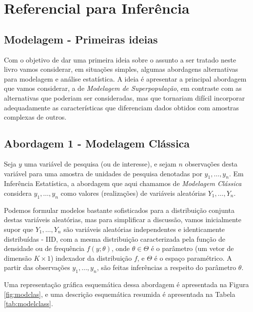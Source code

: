 \documentclass[
  12pt,
  brazilian,
]{book}
\theoremstyle{definition}
\theoremstyle{definition}
\theoremstyle{definition}
\theoremstyle{definition}
\theoremstyle{remark}
\begin{document}
\hypertarget{refinf}{%
\chapter{Referencial para Inferência}\label{refinf}}

\hypertarget{modelagem---primeiras-ideias}{%
\section{Modelagem - Primeiras ideias}\label{modelagem---primeiras-ideias}}

Com o objetivo de dar uma primeira ideia sobre o assunto a ser tratado neste
livro vamos considerar, em situações simples, algumas abordagens alternativas
para modelagem e análise estatística. A ideia é apresentar a principal abordagem
que vamos considerar, a de \emph{Modelagem de Superpopulação}, em contraste com as
alternativas que poderiam ser consideradas, mas que tornariam difícil incorporar
adequadamente as características que diferenciam dados obtidos com amostras complexas de outros.

\hypertarget{classic}{%
\section{Abordagem 1 - Modelagem Clássica}\label{classic}}

Seja \(y\) uma variável de pesquisa (ou de interesse), e sejam \(n\) observações desta
variável para uma amostra de unidades de pesquisa denotadas por \(y_1, \ldots ,y_n\).
Em Inferência Estatística, a abordagem que aqui chamamos de \emph{Modelagem Clássica}\\
considera \(y_1, \ldots ,y_n\) como valores (realizações) de variáveis aleatórias \(Y_1, \ldots ,Y_n\).

Podemos formular modelos bastante sofisticados para a distribuição conjunta
destas variáveis aleatórias, mas para simplificar a discussão, vamos inicialmente
supor que \(Y_1, \ldots ,Y_n\) são variáveis aleatórias independentes e
identicamente distribuídas - IID, com a mesma distribuição caracterizada pela função
de densidade ou de frequência \(f(y;\theta)\), onde \(\theta \in \Theta\) é o parâmetro
(um vetor de dimensão \(K \times 1\)) indexador da distribuição \(f\), e \(\Theta\) é
o espaço paramétrico. A partir das observações \(y_1, \ldots ,y_n\), são feitas inferências a respeito do parâmetro \(\theta\).

Uma representação gráfica esquemática dessa abordagem é apresentada na Figura
\ref{fig:modclas}, e uma descrição esquemática resumida é apresentada na Tabela
\ref{tab:modelclass}.
\end{document}
